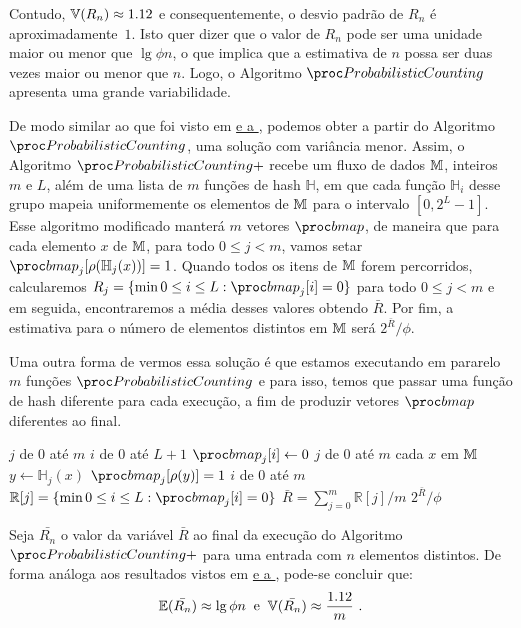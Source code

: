Contudo, $\Vbb(R_n) \approx\nolinebreak 1.12$ e consequentemente, o desvio padrão de $R_n$ é aproximadamente~$1$. 
Isto quer dizer que o valor de $R_n$ pode ser uma unidade maior ou menor que $\lg \phi n$, o que implica que a 
estimativa de $n$ possa ser duas vezes maior ou menor que $n$. Logo, o Algoritmo $\pc$ apresenta uma grande 
variabilidade.

De modo similar ao que foi visto em \hyperref[sec:morris:plus]{ e a }, 
podemos obter a partir do Algoritmo~$\pc$, uma solução com variância menor. Assim, o Algoritmo $\pc{+}$ recebe um fluxo 
de dados $\mathbb{M}$, inteiros $m$ e $L$, além de uma lista de $m$ funções de hash $\mathbb{H}$, em que cada função 
$\mathbb{H}_i$ desse grupo mapeia uniformemente os elementos de $\mathbb{M}$ para o intervalo $[0, 2^L - 1]$. Esse algoritmo 
modificado manterá $m$ vetores $\bitmap$, de maneira que para cada elemento $x$ de $\mathbb{M}$, para todo $0 \leq j < m$, 
vamos setar $\bitmap_j[\rho(\mathbb{H}_{j}(x))] = 1$. Quando todos os itens de $\mathbb{M}$ forem percorridos, calcularemos 
$R_j = \{ \min 0 \leq i \leq L: \bitmap_{j}[i] = 0 \}$ para todo $0 \leq j < m$ e em seguida, encontraremos a média 
desses valores obtendo $\bar{R}$. Por fim, a estimativa para o número de elementos distintos em $\mathbb{M}$ será 
$2^{\bar{R}} / \phi$. 

Uma outra forma de vermos essa solução é que estamos executando em pararelo $m$ funções $\pc$ e para isso, temos que 
passar uma função de hash diferente para cada execução, a fim de produzir vetores $\bitmap$ diferentes ao final.

\begin{codebox}
  \li \For $j$ de $0$ até $m$
      \Do
  \li    \For $i$ de $0$ até $L + 1$
          \Do
  \li       $\bitmap_{j}[i] \gets 0$
          \End
      \End
  \li \For $j$ de $0$ até $m$
      \Do
  \li    \For cada $x$ em $\mathbb{M}$
          \Do
  \li       $y \gets \mathbb{H}_{j}(x)$
  \li       $\bitmap_j[\rho(y)] = 1$
          \End
      \End
  \li \For $i$ de $0$ até $m$
      \Do
  \li    $\mathbb{R}[j] = \{ \min 0 \leq i \leq L: \bitmap_{j}[i] = 0 \}$
      \End
  \li $\bar{R} = \sum_{j=0}^{m} \mathbb{R}[j] / m$
  \li \Return $2^{\bar{R}}/\phi$
  \End
\end{codebox}

Seja $\bar{R_n}$ o valor da variável $\bar{R}$ ao final da execução do Algoritmo~$\pc{+}$ para uma
entrada com $n$ elementos distintos. De forma análoga aos resultados vistos em \hyperref[sec:morris:plus]{ 
e a }, pode-se concluir que:
\[ \mathbb{E}(\bar{R_n}) \approx \lg \phi n   \; \; \text{e}  \; \; \mathbb{V}(\bar{R_n}) \approx \frac{1.12}{m} \ . \]

